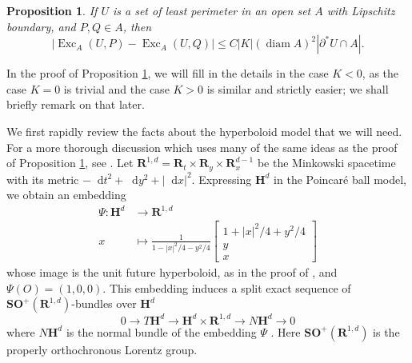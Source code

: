 \documentclass[reqno,10pt]{amsart}
\newcommand{\RR}{\mathbf{R}}
\newcommand{\Hyp}{\mathbf H}
\newcommand{\SpOrth}{\mathbf{SO}}
\DeclareMathOperator{\diam}{diam}
\DeclareMathOperator{\Exc}{Exc}
\newcommand*\dif{\mathop{}\!\mathrm{d}}
\newtheorem{proposition}[theorem]{Proposition}
\theoremstyle{definition}
\numberwithin{equation}{section}
\begin{document}
\begin{proposition}\label{translation invariance}
If $U$ is a set of least perimeter in an open set $A$ with Lipschitz boundary, and $P, Q \in A$, then
$$|\Exc_A(U, P) - \Exc_A(U, Q)| \leq C|K|(\diam A)^2 |\partial^* U \cap A|.$$
\end{proposition}

In the proof of Proposition \ref{translation invariance}, we will fill in the details in the case $K < 0$, as the case $K = 0$ is trivial and the case $K > 0$ is similar and strictly easier; we shall briefly remark on that later.

We first rapidly review the facts about the hyperboloid model that we will need.
For a more thorough discussion which uses many of the same ideas as the proof of Proposition \ref{translation invariance}, see \cite[\S3.1, \S4.1]{daskalopoulosPrep1}.
Let $\RR^{1, d} = \RR_t \times \RR_y \times \RR_x^{d - 1}$ be the Minkowski spacetime with its metric $-\dif t^2 + \dif y^2 + |\dif x|^2$.
Expressing $\Hyp^d$ in the Poincar\'e ball model, we obtain an embedding 
\begin{align*}
\Psi: \Hyp^d &\to \RR^{1, d} \\
x &\mapsto \frac{1}{1 - |x|^2/4 - y^2/4} \begin{bmatrix}1 + |x|^2/4 + y^2/4\\y \\ x\end{bmatrix}
\end{align*}
whose image is the unit future hyperboloid, as in the proof of \cite[Proposition 3.5]{lee1997riemannian}, and $\Psi(O) = (1, 0, 0)$.
This embedding induces a split exact sequence of $\SpOrth^+(\RR^{1, d})$-bundles over $\Hyp^d$
\begin{equation}\label{splitting of tangent bundle}
0 \to T\Hyp^d \to \Hyp^d \times \RR^{1, d} \to N\Hyp^d \to 0
\end{equation}
where $N\Hyp^d$ is the normal bundle of the embedding $\Psi$ \cite[(3.4)]{daskalopoulosPrep1}.
Here $\SpOrth^+(\RR^{1, d})$ is the properly orthochronous Lorentz group.
\end{document}
